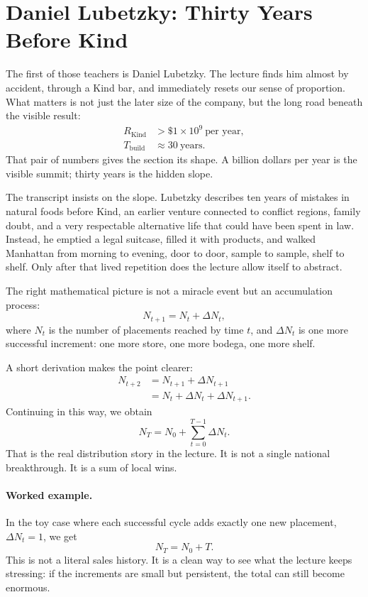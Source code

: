 \section{Daniel Lubetzky: Thirty Years Before Kind}

The first of those teachers is Daniel Lubetzky. The lecture finds him almost by accident, through a Kind bar, and immediately resets our sense of proportion. What matters is not just the later size of the company, but the long road beneath the visible result:
\begin{align}
R_{\mathrm{Kind}} &> \$1\times 10^{9}\ \text{per year},\\
T_{\mathrm{build}} &\approx 30\ \text{years}.
\end{align}
That pair of numbers gives the section its shape. A billion dollars per year is the visible summit; thirty years is the hidden slope.

The transcript insists on the slope. Lubetzky describes ten years of mistakes in natural foods before Kind, an earlier venture connected to conflict regions, family doubt, and a very respectable alternative life that could have been spent in law. Instead, he emptied a legal suitcase, filled it with products, and walked Manhattan from morning to evening, door to door, sample to sample, shelf to shelf. Only after that lived repetition does the lecture allow itself to abstract.

The right mathematical picture is not a miracle event but an accumulation process:
\begin{equation}
N_{t+1}=N_t+\Delta N_t,
\end{equation}
where \(N_t\) is the number of placements reached by time \(t\), and \(\Delta N_t\) is one more successful increment: one more store, one more bodega, one more shelf.

A short derivation makes the point clearer:
\begin{align}
N_{t+2}
&=N_{t+1}+\Delta N_{t+1}\\
&=N_t+\Delta N_t+\Delta N_{t+1}.
\end{align}
Continuing in this way, we obtain
\begin{equation}
N_T = N_0 + \sum_{t=0}^{T-1}\Delta N_t.
\end{equation}
That is the real distribution story in the lecture. It is not a single national breakthrough. It is a sum of local wins.

\paragraph{Worked example.} In the toy case where each successful cycle adds exactly one new placement, \(\Delta N_t=1\), we get
\begin{equation}
N_T=N_0+T.
\end{equation}
This is not a literal sales history. It is a clean way to see what the lecture keeps stressing: if the increments are small but persistent, the total can still become enormous.

